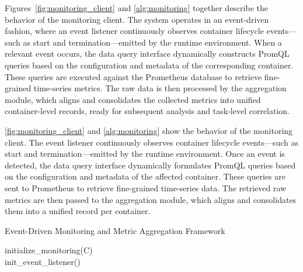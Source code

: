 Figures~\ref{fig:monitoring_client} and \ref{alg:monitoring} together describe the behavior of the monitoring client. The system operates in an event-driven fashion, where an event listener continuously observes container lifecycle events—such as start and termination—emitted by the runtime environment. When a relevant event occurs, the data query interface dynamically constructs PromQL queries based on the configuration and metadata of the corresponding container. These queries are executed against the Prometheus database to retrieve fine-grained time-series metrics. The raw data is then processed by the aggregation module, which aligns and consolidates the collected metrics into unified container-level records, ready for subsequent analysis and task-level correlation.

\ref{fig:monitoring_client} and \ref{alg:monitoring} show the behavior of the monitoring client. The event listener continuously observes container lifecycle events—such as start and termination—emitted by the runtime environment. Once an event is detected, the data query interface dynamically formulates PromQL queries based on the configuration and metadata of the affected container. These queries are sent to Prometheus to retrieve fine-grained time-series data. The retrieved raw metrics are then passed to the aggregation module, which aligns and consolidates them into a unified record per container.

\begin{algorithm}[H]
    \caption{Event-Driven Monitoring and Metric Aggregation Framework}
    \label{alg:monitoring}

    \BlankLine
    initialize\_monitoring(C)\\
    init\_event\_listener()\\
\end{algorithm}

